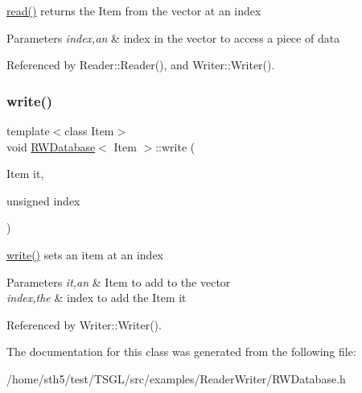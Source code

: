 \hyperlink{class_r_w_database_acb53aad02a38e6e021ba61f63b35ba9a}{read()} returns the Item from the vector at an index 


\begin{DoxyParams}{Parameters}
{\em index,an} & index in the vector to access a piece of data \\
\hline
\end{DoxyParams}


Referenced by Reader\+::\+Reader(), and Writer\+::\+Writer().

\mbox{\label{class_r_w_database_acfdb85c4ae5201e9997265c6d44a3111}} 
\subsubsection{\texorpdfstring{write()}{write()}}
{\footnotesize\ttfamily template$<$class Item$>$ \\
void \hyperlink{class_r_w_database}{R\+W\+Database}$<$ Item $>$\+::write (\begin{DoxyParamCaption}\item[{Item}]{it,  }\item[{unsigned}]{index }\end{DoxyParamCaption})}



\hyperlink{class_r_w_database_acfdb85c4ae5201e9997265c6d44a3111}{write()} sets an item at an index 


\begin{DoxyParams}{Parameters}
{\em it,an} & Item to add to the vector \\
\hline
{\em index,the} & index to add the Item it \\
\hline
\end{DoxyParams}


Referenced by Writer\+::\+Writer().



The documentation for this class was generated from the following file\+:\begin{DoxyCompactItemize}
\item 
/home/sth5/test/\+T\+S\+G\+L/src/examples/\+Reader\+Writer/R\+W\+Database.\+h\end{DoxyCompactItemize}
